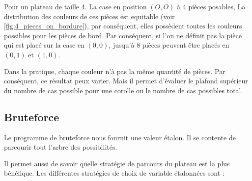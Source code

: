 	\begin{exmp}
		Pour un plateau de taille 4. La case en position $(O,O)$ à 4 pièces posables, La distribution des couleurs de ces pièces est equitable (voir \autoref{fig:4_pieces_on_bordure}), par conséquent, elles possèdent toutes les couleurs possibles pour les pièces de bord. Par conséquent, si l'on ne définit pas la pièce qui est placé sur la case en $(0,0)$, jusqu'à 8 pièces peuvent être placés en $(0,1)$ et $(1,0)$.
	\end{exmp}
	\begin{rem}
		 Dans la pratique, chaque couleur n'à pas la même quantité de pièces. Par conséquent, ce résultat peux varier. Mais il permet d'évaluer le plafond supérieur du nombre de cas possible pour une corolle ou le nombre de cas possibles total.
	\end{rem}
\newpage

	\subsection{Bruteforce}
	
	Le programme de bruteforce nous fournit une valeur étalon. Il se contente de parcourir tout l'arbre des possibilités.
	
	Il permet aussi de savoir quelle stratégie de parcours du plateau est la plus bénéfique. Les différentes stratégies de choix de variable étalonnées sont :
	
